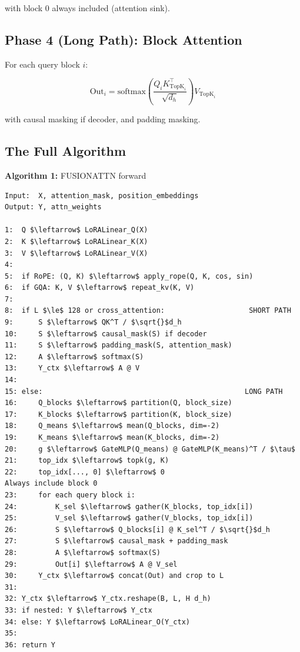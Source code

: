 with block 0 always included (attention sink).

\subsection{Phase 4 (Long Path): Block Attention}

For each query block $i$:

\[
\text{Out}_i = \text{softmax}\!\left(\frac{Q_i K_{\text{TopK}_i}^\top}{\sqrt{d_h}}\right) V_{\text{TopK}_i}
\tag{4.8}
\]

with causal masking if decoder, and padding masking.

\subsection{The Full Algorithm}

\textbf{Algorithm 1:} FUSIONATTN forward
\begin{lstlisting}
Input:  X, attention_mask, position_embeddings
Output: Y, attn_weights

1:  Q $\leftarrow$ LoRALinear_Q(X)
2:  K $\leftarrow$ LoRALinear_K(X)
3:  V $\leftarrow$ LoRALinear_V(X)
4:
5:  if RoPE: (Q, K) $\leftarrow$ apply_rope(Q, K, cos, sin)
6:  if GQA: K, V $\leftarrow$ repeat_kv(K, V)
7:
8:  if L $\le$ 128 or cross_attention:                    SHORT PATH
9:      S $\leftarrow$ QK^T / $\sqrt{}$d_h
10:     S $\leftarrow$ causal_mask(S) if decoder
11:     S $\leftarrow$ padding_mask(S, attention_mask)
12:     A $\leftarrow$ softmax(S)
13:     Y_ctx $\leftarrow$ A @ V
14:
15: else:                                                LONG PATH
16:     Q_blocks $\leftarrow$ partition(Q, block_size)
17:     K_blocks $\leftarrow$ partition(K, block_size)
18:     Q_means $\leftarrow$ mean(Q_blocks, dim=-2)
19:     K_means $\leftarrow$ mean(K_blocks, dim=-2)
20:     g $\leftarrow$ GateMLP(Q_means) @ GateMLP(K_means)^T / $\tau$
21:     top_idx $\leftarrow$ topk(g, K)
22:     top_idx[..., 0] $\leftarrow$ 0                            Always include block 0
23:     for each query block i:
24:         K_sel $\leftarrow$ gather(K_blocks, top_idx[i])
25:         V_sel $\leftarrow$ gather(V_blocks, top_idx[i])
26:         S $\leftarrow$ Q_blocks[i] @ K_sel^T / $\sqrt{}$d_h
27:         S $\leftarrow$ causal_mask + padding_mask
28:         A $\leftarrow$ softmax(S)
29:         Out[i] $\leftarrow$ A @ V_sel
30:     Y_ctx $\leftarrow$ concat(Out) and crop to L
31:
32: Y_ctx $\leftarrow$ Y_ctx.reshape(B, L, H d_h)
33: if nested: Y $\leftarrow$ Y_ctx
34: else: Y $\leftarrow$ LoRALinear_O(Y_ctx)
35:
36: return Y
\end{lstlisting}

